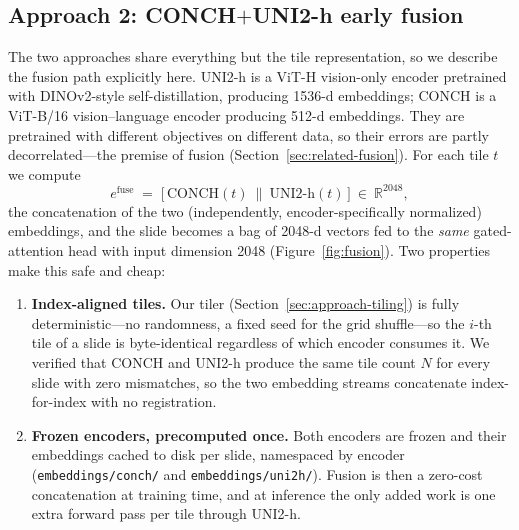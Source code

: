 \documentclass[11pt,a4paper]{article}
\newcommand{\code}[1]{\texttt{\small #1}}
\begin{document}
\subsection{Approach 2: CONCH$+$UNI2-h early fusion}
\label{sec:approach-fusion}
The two approaches share everything but the tile representation, so we describe the fusion path
explicitly here. UNI2-h \cite{chen2024uni} is a ViT-H vision-only encoder pretrained with
DINOv2-style self-distillation, producing 1536-d embeddings; CONCH is a ViT-B/16
vision--language encoder producing 512-d embeddings. They are pretrained with different objectives
on different data, so their errors are partly decorrelated---the premise of fusion
(Section~\ref{sec:related-fusion}). For each tile $t$ we compute
\begin{equation}
  e^{\text{fuse}} \;=\; \big[\, \text{CONCH}(t)\ \|\ \text{UNI2-h}(t)\,\big]\ \in\ \mathbb{R}^{2048},
\end{equation}
the concatenation of the two (independently, encoder-specifically normalized) embeddings, and the
slide becomes a bag of 2048-d vectors fed to the \emph{same} gated-attention head with input
dimension 2048 (Figure~\ref{fig:fusion}). Two properties make this safe and cheap:

\begin{enumerate}[leftmargin=1.4em,itemsep=2pt]
  \item \textbf{Index-aligned tiles.} Our tiler (Section~\ref{sec:approach-tiling}) is fully
        deterministic---no randomness, a fixed seed for the grid shuffle---so the $i$-th tile of a
        slide is byte-identical regardless of which encoder consumes it. We verified that CONCH and
        UNI2-h produce the same tile count $N$ for every slide with zero mismatches, so the two
        embedding streams concatenate index-for-index with no registration.
  \item \textbf{Frozen encoders, precomputed once.} Both encoders are frozen and their embeddings
        cached to disk per slide, namespaced by encoder
        (\code{embeddings/conch/} and \code{embeddings/uni2h/}). Fusion is then a zero-cost
        concatenation at training time, and at inference the only added work is one extra forward
        pass per tile through UNI2-h.
\end{enumerate}
\end{document}
